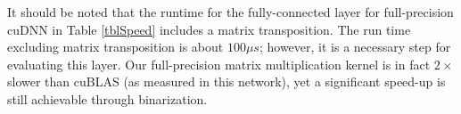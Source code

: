 \documentclass[conference,compsoc]{IEEEtran}
\newcommand{\expendable}[1]{\textcolor{blue}{\textit{ Exclusively Expendable (#1)}}}
\begin{document}
It should be noted that the runtime for the fully-connected layer for full-precision cuDNN in Table \ref{tblSpeed} includes a matrix transposition. The run time excluding matrix transposition is about $100 \mu s$; however, it is a necessary step for evaluating this layer. Our full-precision matrix multiplication kernel is in fact $2\times$ slower than cuBLAS (as measured in this network), yet a significant speed-up is still achievable through binarization.



 


 
\end{document}
